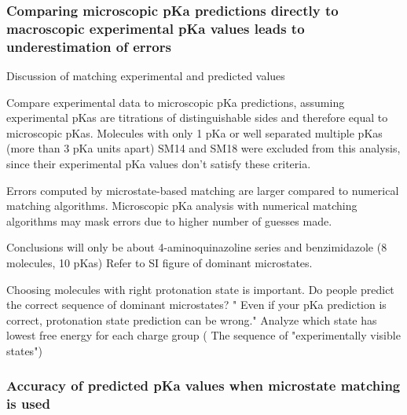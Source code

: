 \documentclass[9pt,lineno,final]{elife}
\begin{document}
\subsubsection{Comparing microscopic pKa predictions directly to macroscopic experimental pKa values leads to underestimation of errors}
Discussion of matching experimental and predicted values

Compare experimental data to microscopic pKa predictions, assuming experimental pKas are titrations of distinguishable sides and therefore equal to microscopic pKas.
Molecules with only 1 pKa or well separated multiple pKas (more than 3 pKa units apart) SM14 and SM18 were excluded from this analysis, since their experimental pKa values don't satisfy these criteria.

Errors computed by microstate-based matching are larger compared to numerical matching algorithms.
Microscopic pKa analysis with numerical matching algorithms may mask errors due to higher number of guesses made.




Conclusions will only be about 4-aminoquinazoline series and benzimidazole (8 molecules, 10 pKas)
Refer to SI figure of dominant microstates.

Choosing molecules with right protonation state is important.
Do people predict the correct sequence of dominant microstates?
 " Even if your pKa prediction is correct, protonation state prediction can be wrong."
 Analyze which state has lowest free energy for each charge group ( The sequence of "experimentally visible states")



\subsubsection{Accuracy of predicted pKa values when microstate matching is used}


\end{document}
